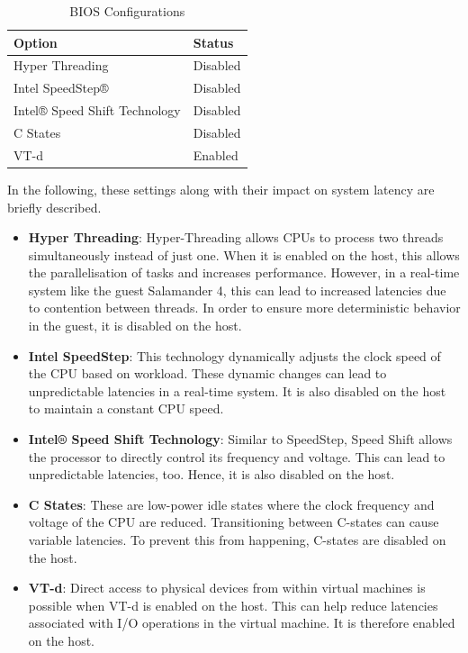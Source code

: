 \documentclass[MMR,Master,english]{twbook}
\begin{document}
\begin{table}[H]
	\centering
	\caption{BIOS Configurations}
	\label{tab:bios_configuration}
	\setlength{\tabcolsep}{0.5em} %
	{\renewcommand{\arraystretch}{1.2}%
	\begin{tabular}{|l|l|}
	\hline
	\textbf{Option} & \textbf{Status} \\
	\hline
	Hyper Threading & Disabled \\
	\hline
	Intel SpeedStep® & Disabled \\
	\hline
	Intel® Speed Shift Technology & Disabled \\
	\hline
	C States & Disabled \\
	\hline
	VT-d & Enabled \\
	\hline
	\end{tabular}}
	\end{table}	
	
	\noindent In the following, these settings along with their impact on system latency are briefly described. 

	\begin{itemize}
		\item \textbf{Hyper Threading}: Hyper-Threading allows CPUs to process two threads simultaneously instead of just one. When it is enabled on the host, this allows the parallelisation of tasks and increases performance. However, in a real-time system like the guest Salamander 4, this can lead to increased latencies due to contention between threads. In order to ensure more deterministic behavior in the guest, it is disabled on the host.
		\item \textbf{Intel SpeedStep}: This technology dynamically adjusts the clock speed of the CPU based on workload. These dynamic changes can lead to unpredictable latencies in a real-time system. It is also disabled on the host to maintain a constant CPU speed.
		\item \textbf{Intel® Speed Shift Technology}: Similar to SpeedStep, Speed Shift allows the processor to directly control its frequency and voltage. This can lead to unpredictable latencies, too. Hence, it is also disabled on the host.
		\item \textbf{C States}: These are low-power idle states where the clock frequency and voltage of the CPU are reduced. Transitioning between C-states can cause variable latencies. To prevent this from happening, C-states are disabled on the host.
		\item \textbf{VT-d}: Direct access to physical devices from within virtual machines is possible when VT-d is enabled on the host. This can help reduce latencies associated with I/O operations in the virtual machine. It is therefore enabled on the host.
	\end{itemize}
\end{document}

